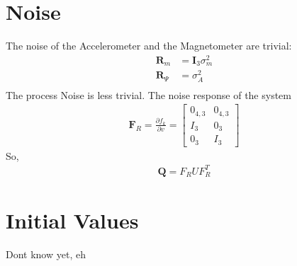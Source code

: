 \documentclass[10pt,a4paper]{article}
\newcommand{\M}[1]{\mathbf{#1}}
\begin{document}
\section{Noise}
The noise of the Accelerometer and the Magnetometer are trivial: 
\begin{align}
  \M R_m &= \M I_3 \sigma_m^2 \\
  \M R_\Psi &= \sigma_A^2 \\
\end{align}
The process Noise is less trivial.
The noise response of the system
\begin{align}
  \M F_R = \frac {\partial f_k} {\partial v} =
  \begin{bmatrix}
    0_{4,3} & 0_{4,3} \\
    I_3 & 0_3 \\
    0_3 & I_3
  \end{bmatrix}
\end{align}
So,
\begin{align}
  \M Q = F_R U F_R^T
\end{align}


\section{Initial Values}
Dont know yet, eh
\end{document}
